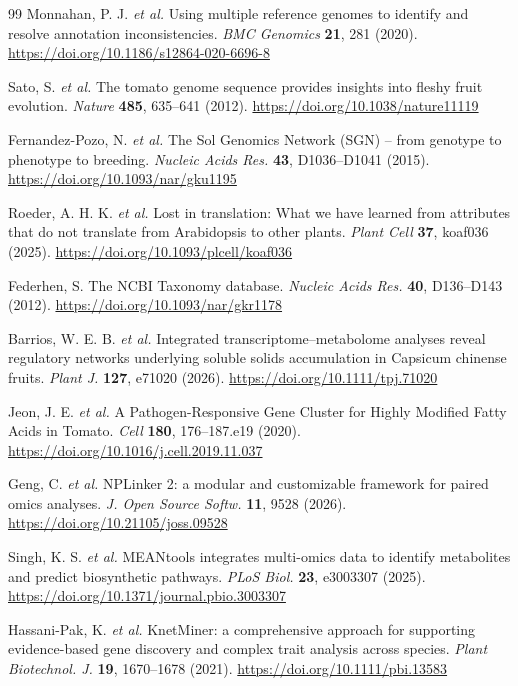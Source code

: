 \documentclass[11pt,a4paper]{article}
\begin{document}
\begin{thebibliography}{99}
Monnahan, P. J. \textit{et al.} Using multiple reference genomes to identify and resolve annotation inconsistencies. \textit{BMC Genomics} \textbf{21}, 281 (2020). \url{https://doi.org/10.1186/s12864-020-6696-8}

Sato, S. \textit{et al.} The tomato genome sequence provides insights into fleshy fruit evolution. \textit{Nature} \textbf{485}, 635--641 (2012). \url{https://doi.org/10.1038/nature11119}

Fernandez-Pozo, N. \textit{et al.} The Sol Genomics Network (SGN) -- from genotype to phenotype to breeding. \textit{Nucleic Acids Res.} \textbf{43}, D1036--D1041 (2015). \url{https://doi.org/10.1093/nar/gku1195}

Roeder, A. H. K. \textit{et al.} Lost in translation: What we have learned from attributes that do not translate from Arabidopsis to other plants. \textit{Plant Cell} \textbf{37}, koaf036 (2025). \url{https://doi.org/10.1093/plcell/koaf036}

Federhen, S. The NCBI Taxonomy database. \textit{Nucleic Acids Res.} \textbf{40}, D136--D143 (2012). \url{https://doi.org/10.1093/nar/gkr1178}

Barrios, W. E. B. \textit{et al.} Integrated transcriptome--metabolome analyses reveal regulatory networks underlying soluble solids accumulation in Capsicum chinense fruits. \textit{Plant J.} \textbf{127}, e71020 (2026). \url{https://doi.org/10.1111/tpj.71020}

Jeon, J. E. \textit{et al.} A Pathogen-Responsive Gene Cluster for Highly Modified Fatty Acids in Tomato. \textit{Cell} \textbf{180}, 176--187.e19 (2020). \url{https://doi.org/10.1016/j.cell.2019.11.037}

Geng, C. \textit{et al.} NPLinker 2: a modular and customizable framework for paired omics analyses. \textit{J. Open Source Softw.} \textbf{11}, 9528 (2026). \url{https://doi.org/10.21105/joss.09528}

Singh, K. S. \textit{et al.} MEANtools integrates multi-omics data to identify metabolites and predict biosynthetic pathways. \textit{PLoS Biol.} \textbf{23}, e3003307 (2025). \url{https://doi.org/10.1371/journal.pbio.3003307}

Hassani-Pak, K. \textit{et al.} KnetMiner: a comprehensive approach for supporting evidence-based gene discovery and complex trait analysis across species. \textit{Plant Biotechnol. J.} \textbf{19}, 1670--1678 (2021). \url{https://doi.org/10.1111/pbi.13583}


\end{thebibliography}
\end{document}
